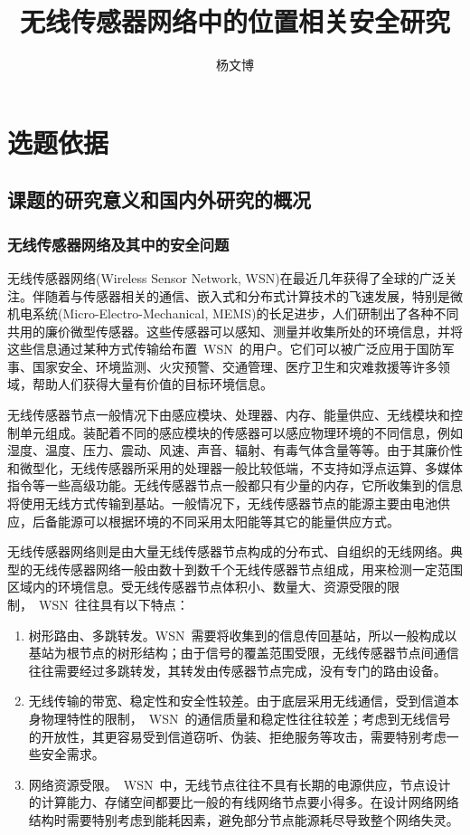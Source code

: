 \documentclass[a4paper,10pt]{article}
\title{无线传感器网络中的位置相关安全研究}
\author{杨文博}
\begin{document}
\maketitle

\section{ 选题依据 } 

\subsection{课题的研究意义和国内外研究的概况}

\subsubsection{无线传感器网络及其中的安全问题}  

无线传感器网络(Wireless Sensor Network, WSN)在最近几年获得了全球的广泛关注。伴随着与传感器相关的通信、嵌入式和分布式计算技术的飞速发展，特别是微机电系统(Micro-Electro-Mechanical, MEMS)的长足进步，人们研制出了各种不同共用的廉价微型传感器。这些传感器可以感知、测量并收集所处的环境信息，并将这些信息通过某种方式传输给布置~WSN~的用户。它们可以被广泛应用于国防军事、国家安全、环境监测、火灾预警、交通管理、医疗卫生和灾难救援等许多领域，帮助人们获得大量有价值的目标环境信息。

无线传感器节点一般情况下由感应模块、处理器、内存、能量供应、无线模块和控制单元组成。装配着不同的感应模块的传感器可以感应物理环境的不同信息，例如湿度、温度、压力、震动、风速、声音、辐射、有毒气体含量等等。由于其廉价性和微型化，无线传感器所采用的处理器一般比较低端，不支持如浮点运算、多媒体指令等一些高级功能。无线传感器节点一般都只有少量的内存，它所收集到的信息将使用无线方式传输到基站。一般情况下，无线传感器节点的能源主要由电池供应，后备能源可以根据环境的不同采用太阳能等其它的能量供应方式。

无线传感器网络则是由大量无线传感器节点构成的分布式、自组织的无线网络。典型的无线传感器网络一般由数十到数千个无线传感器节点组成，用来检测一定范围区域内的环境信息。受无线传感器节点体积小、数量大、资源受限的限制，~WSN~往往具有以下特点：

\begin{enumerate}

\item 树形路由、多跳转发。WSN~需要将收集到的信息传回基站，所以一般构成以基站为根节点的树形结构；由于信号的覆盖范围受限，无线传感器节点间通信往往需要经过多跳转发，其转发由传感器节点完成，没有专门的路由设备。

\item 无线传输的带宽、稳定性和安全性较差。由于底层采用无线通信，受到信道本身物理特性的限制，~WSN~的通信质量和稳定性往往较差；考虑到无线信号的开放性，其更容易受到信道窃听、伪装、拒绝服务等攻击，需要特别考虑一些安全需求。

\item 网络资源受限。~WSN~中，无线节点往往不具有长期的电源供应，节点设计的计算能力、存储空间都要比一般的有线网络节点要小得多。在设计网络网络结构时需要特别考虑到能耗因素，避免部分节点能源耗尽导致整个网络失灵。

\end{enumerate}
\end{document}
